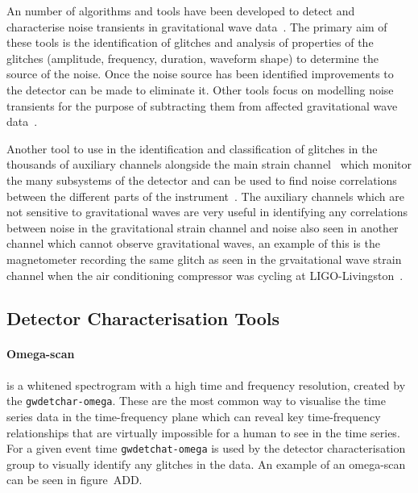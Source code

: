 An number of algorithms and tools have been developed to detect and characterise noise transients in gravitational wave data~\cite{ArchEnemy:2023, reducing_scattering:2020, Glanzer:2023, gravityspy:2017, gravityspy:2021, gravityspy:2023, glitschen:2021,  BayesWave:2015, gwadaptive:2022, O3_subtraction:2022, Powell:2016, glitschen:2021}. The primary aim of these tools is the identification of glitches and analysis of properties of the glitches (amplitude, frequency, duration, waveform shape) to determine the source of the noise. Once the noise source has been identified improvements to the detector can be made to eliminate it. Other tools focus on modelling noise transients for the purpose of subtracting them from affected gravitational wave data~\cite{ArchEnemy:2023, BayesWave:2015, glitschen:2021, antiglitch:2023}.
%
%


Another tool to use in the identification and classification of glitches in the thousands of auxiliary channels alongside the main strain channel~\cite{iDQ:2020} which monitor the many subsystems of the detector and can be used to find noise correlations between the different parts of the instrument~\cite{DQ_vetoes:2017}. The auxiliary channels which are not sensitive to gravitational waves are very useful in identifying any correlations between noise in the gravitational strain channel and noise also seen in another channel which cannot observe gravitational waves, an example of this is the magnetometer recording the same glitch as seen in the grvaitational wave strain channel when the air conditioning compressor was cycling at LIGO-Livingston~\cite{Nuttall:2018}.

\subsection{\label{3:sec:detchar-tools}Detector Characterisation Tools}
\paragraph{Omega-scan}

is a whitened spectrogram with a high time and frequency resolution, created by the \verb|gwdetchar-omega|. These are the most common way to visualise the time series data in the time-frequency plane which can reveal key time-frequency relationships that are virtually impossible for a human to see in the time series. For a given event time \verb|gwdetchat-omega| is used by the detector characterisation group to visually identify any glitches in the data. An example of an omega-scan can be seen in figure~ADD.
%

